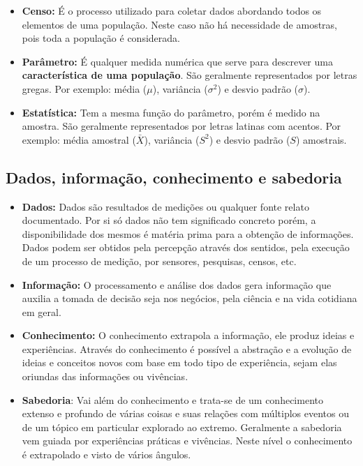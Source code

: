 \documentclass[11pt,]{style/krantz}
\theoremstyle{definition}
\theoremstyle{definition}
\theoremstyle{definition}
\theoremstyle{remark}
\begin{document}
\begin{itemize}
\item
  \textbf{Censo:} É o processo utilizado para coletar dados abordando todos os elementos de uma população. Neste caso não há necessidade de amostras, pois toda a população é considerada.
\item
  \textbf{Parâmetro: } É qualquer medida numérica que serve para descrever uma \textbf{característica de uma população}. São geralmente representados por letras gregas. Por exemplo: média (\(\mu\)), variância (\(\sigma^2\)) e desvio padrão (\(\sigma\)).
\item
  \textbf{Estatística: } Tem a mesma função do parâmetro, porém é medido na amostra. São geralmente representados por letras latinas com acentos. Por exemplo: média amostral (\(\bar X\)), variância (\(S^2\)) e desvio padrão (\(S\)) amostrais.
\end{itemize}

\hypertarget{dados-informacao-conhecimento-e-sabedoria}{%
\subsection{Dados, informação, conhecimento e sabedoria}\label{dados-informacao-conhecimento-e-sabedoria}}

\begin{itemize}
\item
  \textbf{Dados: }Dados são resultados de medições ou qualquer fonte relato documentado. Por si só dados não tem significado concreto porém, a disponibilidade dos mesmos é matéria prima para a obtenção de informações. Dados podem ser obtidos pela percepção através dos sentidos, pela execução de um processo de medição, por sensores, pesquisas, censos, etc.
\item
  \textbf{Informação:} O processamento e análise dos dados gera informação que auxilia a tomada de decisão seja nos negócios, pela ciência e na vida cotidiana em geral.
\item
  \textbf{Conhecimento:} O conhecimento extrapola a informação, ele produz ideias e experiências. Através do conhecimento é possível a abstração e a evolução de ideias e conceitos novos com base em todo tipo de experiência, sejam elas oriundas das informações ou vivências.
\item
  \textbf{Sabedoria}: Vai além do conhecimento e trata-se de um conhecimento extenso e profundo de várias coisas e suas relações com múltiplos eventos ou de um tópico em particular explorado ao extremo. Geralmente a sabedoria vem guiada por experiências práticas e vivências. Neste nível o conhecimento é extrapolado e visto de vários ângulos.
\end{itemize}
\end{document}
